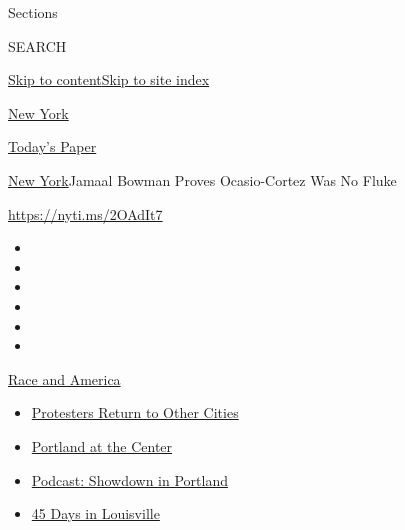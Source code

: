 Sections

SEARCH

\protect\hyperlink{site-content}{Skip to
content}\protect\hyperlink{site-index}{Skip to site index}

\href{https://www.nytimes.com/section/nyregion}{New York}

\href{https://myaccount.nytimes.com/auth/login?response_type=cookie\&client_id=vi}{}

\href{https://www.nytimes.com/section/todayspaper}{Today's Paper}

\href{/section/nyregion}{New York}\textbar{}Jamaal Bowman Proves
Ocasio-Cortez Was No Fluke

\url{https://nyti.ms/2OAdIt7}

\begin{itemize}
\item
\item
\item
\item
\item
\item
\end{itemize}

\href{https://www.nytimes.com/news-event/george-floyd-protests-minneapolis-new-york-los-angeles?action=click\&pgtype=Article\&state=default\&region=TOP_BANNER\&context=storylines_menu}{Race
and America}

\begin{itemize}
\tightlist
\item
  \href{https://www.nytimes.com/2020/07/26/us/protests-portland-seattle-trump.html?action=click\&pgtype=Article\&state=default\&region=TOP_BANNER\&context=storylines_menu}{Protesters
  Return to Other Cities}
\item
  \href{https://www.nytimes.com/2020/07/24/us/portland-oregon-protests-white-race.html?action=click\&pgtype=Article\&state=default\&region=TOP_BANNER\&context=storylines_menu}{Portland
  at the Center}
\item
  \href{https://www.nytimes.com/2020/07/23/podcasts/the-daily/portland-protests.html?action=click\&pgtype=Article\&state=default\&region=TOP_BANNER\&context=storylines_menu}{Podcast:
  Showdown in Portland}
\item
  \href{https://www.nytimes.com/interactive/2020/07/16/us/black-lives-matter-protests-louisville-breonna-taylor.html?action=click\&pgtype=Article\&state=default\&region=TOP_BANNER\&context=storylines_menu}{45
  Days in Louisville}
\end{itemize}

